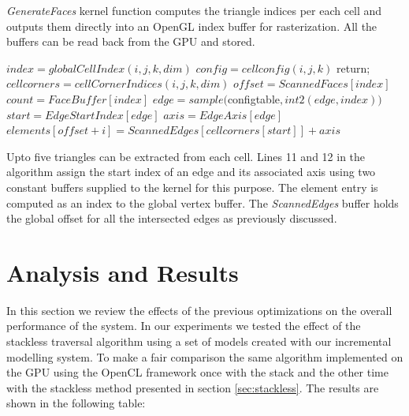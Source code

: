 \begin{algorithm}[H]
\caption{\textit{GenerateFaces} kernel function computes the triangle indices per each cell and outputs them directly into an
OpenGL index buffer for rasterization. All the buffers can be read back from the GPU and stored.}
\label{alg:generatefaceskernel}
\begin{algorithmic}[1]	 
  \STATE $index = globalCellIndex(i, j, k, dim)$
  \STATE $config = cellconfig(i, j, k)$
	  \STATE return;
	  \ENDIF	
   \STATE $cellcorners = cellCornerIndices(i, j, k, dim)$
   \STATE $offset = ScannedFaces[index]$
   \STATE $count = FaceBuffer[index]$
	 \STATE $edge = sample($configtable$, int2(edge, index))$
	 \STATE $start = EdgeStartIndex[edge]$
	 \STATE $axis = EdgeAxis[edge]$
	 \STATE $elements[offset + i] = ScannedEdges[cellcorners[start]] + axis$
   \ENDFOR				

\end{algorithmic}
\end{algorithm}


Upto five triangles can be extracted from each cell. Lines 11 and 12 in the algorithm assign the start index of an 
edge and its associated axis using two constant buffers supplied to the kernel for this purpose. 
The element entry is computed as an index to the global vertex buffer. The \textit{ScannedEdges} 
buffer holds the global offset for all the intersected edges as previously discussed. 

\section{Analysis and Results}
In this section we review the effects of the previous optimizations on the overall performance of the system.
In our experiments we tested the effect of the stackless \blob traversal algorithm using a set of models created 
with our incremental modelling system. To make a fair comparison the same algorithm implemented on the GPU using
the OpenCL framework once with the stack and the other time with the stackless method presented in section 
\ref{sec:stackless}. The results are shown in the following table:



